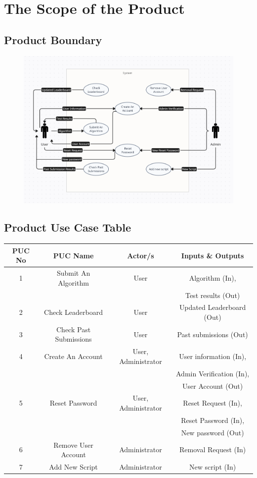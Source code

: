 \documentclass[12pt]{article}
\begin{document}
\section{The Scope of the Product}
\subsection{Product Boundary}
\begin{figure}[H]
    \centering
    \includegraphics[width=1\linewidth]{diagrams/Use.png}
\end{figure}
\subsection{Product Use Case Table}
\begin{table}[H]
    \centering
    \begin{tabular}{|c|c|c|c|}
         \hline \textbf{PUC No} & \textbf{PUC Name} & \textbf{Actor/s} & \textbf{Inputs \& Outputs}\\
         \hline 1 & Submit An Algorithm & User & Algorithm (In), \\
         & & & Test results (Out)\\
         \hline 2 & Check Leaderboard & User & Updated Leaderboard (Out)\\
         \hline 3 & Check Past Submissions & User & Past submissions (Out)\\
         \hline 4 & Create An Account & User, Administrator & User information (In), \\
         & & & Admin Verification (In), \\
         & & & User Account (Out)\\
         \hline 5 & Reset Password & User, Administrator & Reset Request (In), \\
         & & & Reset Password (In), \\
         & & & New password (Out)\\
         \hline 6 & Remove User Account & Administrator & Removal Request (In)\\
         \hline 7 & Add New Script & Administrator & New script (In)\\
         \hline
    \end{tabular}
\end{table}
\end{document}
